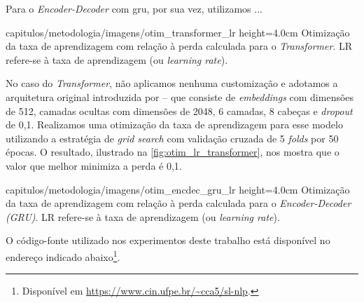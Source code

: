 Para o \textit{Encoder-Decoder} com \acrshort{gru}, por sua vez, utilizamos ...


    {capitulos/metodologia/imagens/otim_transformer_lr}
    {height=4.0cm}
    {Otimização da taxa de aprendizagem com relação à perda calculada para o \textit{Transformer}. LR refere-se à taxa de aprendizagem (ou \textit{learning rate}).}
    {}


No caso do \textit{Transformer}, não aplicamos nenhuma customização e adotamos a arquitetura original introduzida por  -- que consiste de \textit{embeddings} com dimensões de 512, camadas ocultas com dimensões de 2048, 6 camadas, 8 cabeças e \textit{dropout} de 0,1.
Realizamos uma otimização da taxa de aprendizagem para esse modelo utilizando a estratégia de \textit{grid search} com validação cruzada de 5 \textit{folds} por 50 épocas. O resultado, ilustrado na \autoref{fig:otim_lr_transformer}, nos mostra que o valor que melhor minimiza a perda é 0,1.

    {capitulos/metodologia/imagens/otim_encdec_gru_lr}
    {height=4.0cm}
    {Otimização da taxa de aprendizagem com relação à perda calculada para o \textit{Encoder-Decoder (GRU)}. LR refere-se à taxa de aprendizagem (ou \textit{learning rate}).}
    {}

O código-fonte utilizado nos experimentos deste trabalho está disponível no endereço indicado abaixo\footnote{
    Disponível em \url{https://www.cin.ufpe.br/~cca5/sl-nlp}.
}.









